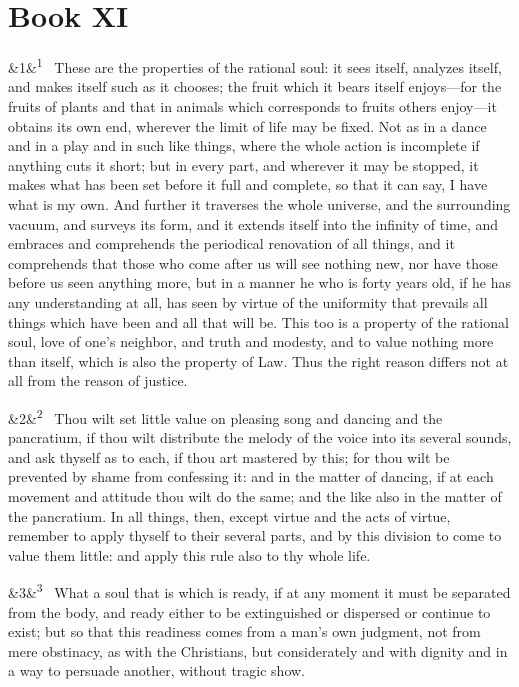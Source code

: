 \documentclass[12pt]{article}
\newcommand{\para}[1][]{\par\noindent\ifx&#1&\else\textsuperscript{\footnotesize #1}~\fi}
\begin{document}
\section*{Book XI}

\para[1] These are the properties of the rational soul: it sees itself, analyzes
itself, and makes itself such as it chooses; the fruit which it bears
itself enjoys---for the fruits of plants and that in animals which
corresponds to fruits others enjoy---it obtains its own end, wherever the
limit of life may be fixed. Not as in a dance and in a play and in such
like things, where the whole action is incomplete if anything cuts it
short; but in every part, and wherever it may be stopped, it makes what
has been set before it full and complete, so that it can say, I have
what is my own. And further it traverses the whole universe, and the
surrounding vacuum, and surveys its form, and it extends itself into the
infinity of time, and embraces and comprehends the periodical
renovation of all things, and it comprehends that those who come after
us will see nothing new, nor have those before us seen anything more,
but in a manner he who is forty years old, if he has any understanding
at all, has seen by virtue of the uniformity that prevails all things
which have been and all that will be. This too is a property of the
rational soul, love of one's neighbor, and truth and modesty, and to
value nothing more than itself, which is also the property of Law.
Thus the right reason differs not at all from the reason of justice.

\para[2] Thou wilt set little value on pleasing song and dancing and the
pancratium, if thou wilt distribute the melody of the voice into its
several sounds, and ask thyself as to each, if thou art mastered by
this; for thou wilt be prevented by shame from confessing it: and in the
matter of dancing, if at each movement and attitude thou wilt do the
same; and the like also in the matter of the pancratium. In all things,
then, except virtue and the acts of virtue, remember to apply thyself to
their several parts, and by this division to come to value them little:
and apply this rule also to thy whole life.

\para[3] What a soul that is which is ready, if at any moment it must be
separated from the body, and ready either to be extinguished or
dispersed or continue to exist; but so that this readiness comes from a
man's own judgment, not from mere obstinacy, as with the Christians,
but considerately and with dignity and in a way to persuade another,
without tragic show.
\end{document}
